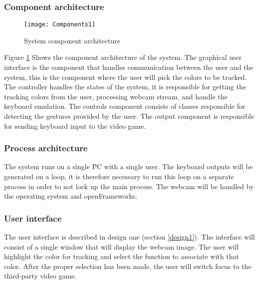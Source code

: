 \subsubsection{Component architecture}

\begin{figure}[!htb]
\centering
\texttt{[image: Components1]}
\caption{System component architecture}
\label{fig:components}
\end{figure}

Figure \ref{fig:components} Shows the component architecture of the system. The graphical user interface is the component that handles communication between the user and the system, this is the component where the user will pick the colors to be tracked. The controller handles the states of the system, it is responsible for getting the tracking colors from the user, processing webcam stream, and handle the keyboard emulation. The controls component consists of classes responsible for detecting the gestures provided by the user. The output component is responsible for sending keyboard input to the video game.

\subsubsection*{Process architecture}
The system runs on a single PC with a single user. The keyboard outputs will be generated on a loop, it is therefore necessary to run this loop on a separate process in order to not lock up the main process. The webcam will be handled by the operating system and openFrameworks.

\subsubsection{User interface}
The user interface is described in design one (section \ref{design1}). 
The interface will consist of a single window that will display the webcam image. 
The user will highlight the color for tracking and select the function to associate with that color. 
After the proper selection has been made, the user will switch focus to the third-party video game.
